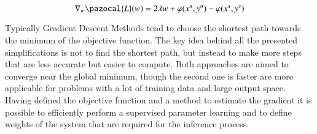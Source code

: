 \begin{equation}
    \label{eq:gradient_final}
    \nabla_w\pazocal{L}(w) = 2\lambda w + \varphi(x^n,y^n) -\varphi(x^s,y^s)
\end{equation}


Typically Gradient Descent Methods tend to choose the shortest path towards the minimum of the objective function. The key idea behind all the presented simplifications is not to find the shortest path, but instead to make more steps that are less accurate but easier to compute. Both approaches are aimed to converge near the global minimum, though the second one is faster are more applicable for problems with a lot of training data and large output space. Having defined the objective function and a method to estimate the gradient it is possible to efficiently perform a supervised parameter learning and to define weights of the system that are required for the inference process.
